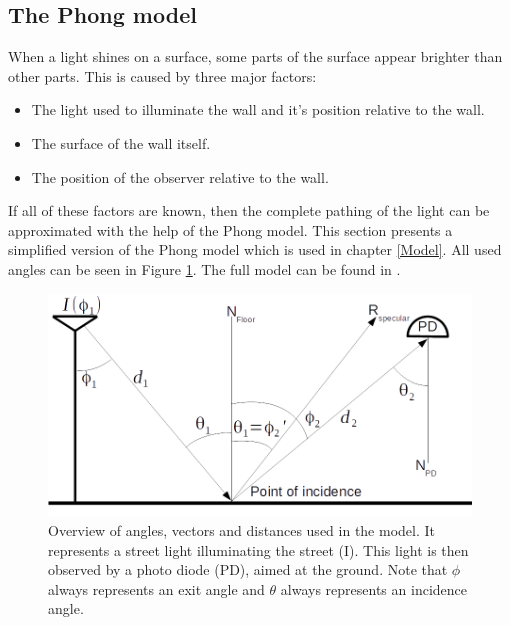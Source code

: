 \subsection{The Phong model}
\label{Model_explained}
When a light shines on a surface, some parts of the surface appear brighter than other parts. This is caused by three major factors:
\begin{itemize}[itemsep=-1ex,topsep=0pt]
	\item The light used to illuminate the wall and it's position relative to the wall.
	\item The surface of the wall itself.
	\item The position of the observer relative to the wall.
\end{itemize}
If all of these factors are known, then the complete pathing of the light can be approximated with the help of the Phong model. This section presents a simplified version of the Phong model which is used in chapter \ref{Model}. All used angles can be seen in Figure \ref{fig:model_overview}. The full model can be found in \cite{Advances_In_Optical_Communication}.

\begin{figure}
	\includegraphics[width=\textwidth]{pics/single_light_post.png}
	\caption{Overview of angles, vectors and distances used in the model. It represents a street light illuminating the street (I). This light is then observed by a photo diode (PD), aimed at the ground. Note that $\phi$ always represents an exit angle and $\theta$ always represents an incidence angle.\label{fig:model_overview}}
\end{figure}

